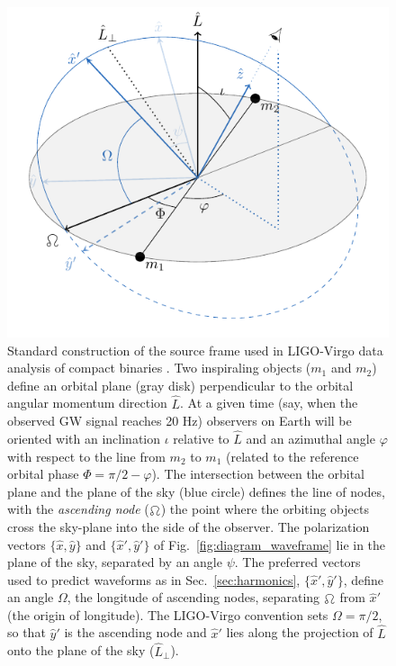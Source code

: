 \documentclass[aps,prd,twocolumn,superscriptaddress,preprintnumbers,floatfix,nofootinbib]{revtex4-2}
\begin{document}
\begin{figure}
\includegraphics[width=0.9\columnwidth]{diagram_sourceframe.pdf}
\caption{Standard construction of the source frame used in LIGO-Virgo data analysis of compact binaries \cite{LALSuite:source}. Two inspiraling objects ($m_1$ and $m_2$) define an orbital plane (gray disk) perpendicular to the orbital angular momentum direction $\hat{L}$. At a given time (say, when the observed GW signal reaches 20 Hz) observers on Earth will be oriented with an inclination $\iota$ relative to $\hat{L}$ and an azimuthal angle $\varphi$ with respect to the line from $m_2$ to $m_1$ (related to the reference orbital phase $\Phi=\pi/2-\varphi$).
The intersection between the orbital plane and the plane of the sky (blue circle) defines the line of nodes, with the \emph{ascending node} ($\ascnode$) the point where the orbiting objects cross the sky-plane into the side of the observer.
The polarization vectors $\{\hat{x},\hat{y}\}$ and $\{\hat{x}',\hat{y}'\}$ of Fig.~\ref{fig:diagram_waveframe} lie in the plane of the sky, separated by an angle $\psi$.
The preferred vectors used to predict waveforms as in Sec.~\ref{sec:harmonics}, $\{\hat{x}',\hat{y}'\}$, define an angle $\Omega$, the longitude of ascending nodes, separating $\ascnode$ from $\hat{x}'$ (the origin of longitude).
The LIGO-Virgo convention sets $\Omega=\pi/2$, so that $\hat{y}'$ is the ascending node and $\hat{x}'$ lies along the projection of $\hat{L}$ onto the plane of the sky ($\hat{L}_\perp$).
}
\label{fig:diagram_sourceframe}
\end{figure}
\end{document}

